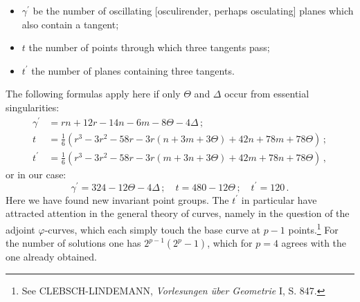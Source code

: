 \documentclass[leqno]{article}
\begin{document}
\begin{itemize}[label={}]
	\item $ \gamma^\prime $ be the number of oscillating [osculirender, perhaps osculating] planes which also contain a tangent;
	\item $ t $ the number of points through which three tangents pass;
	\item $ t^\prime $ the number of planes containing three tangents.
\end{itemize}
The following formulas apply here if only $ \Theta $ and $ \Delta$ occur from essential singularities:
\begin{align*}
	\gamma^\prime &= rn + 12r - 14n - 6m - 8\Theta - 4\Delta  \, ; \\
	t &= \frac{1}{6}\left(r^3 - 3r^2 - 58r - 3r \left(n + 3m + 3\Theta \right) +42n + 78m + 78\Theta \right) \, ; \\
	t^\prime &= \frac{1}{6} \left(r^3 - 3r^2 - 58r - 3r \left(m + 3n + 3\Theta \right)+42m + 78n + 78\Theta\right) \, , 
\end{align*}
or in our case:
\[
\gamma^\prime = 324 - 12\Theta - 4\Delta \, ; \quad t=480-12\Theta \, ; \quad t^\prime = 120 \, . 
\]
Here we have found new invariant point groups. The $ t^\prime $ in particular have attracted attention in the general theory of curves, namely in the question of the adjoint $ \varphi$-curves, which each simply touch the base curve at $ p-1 $ points.\footnote{See CLEBSCH-LINDEMANN, \textit{Vorlesungen \"uber Geometrie} I, S. 847.} For the number of solutions one has $ 2^{p-1} (2^p-1) $, which for $ p = 4 $ agrees with the one already obtained.
\end{document}
